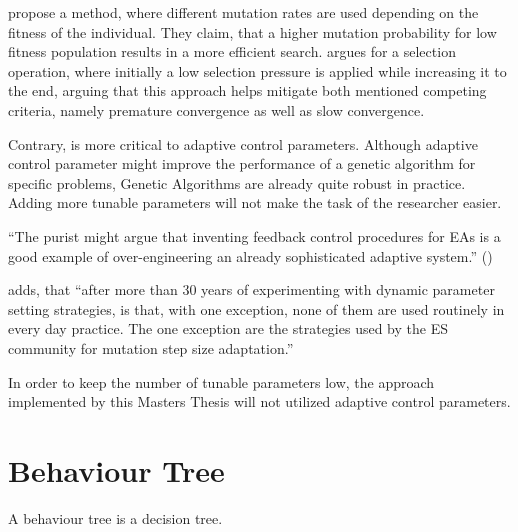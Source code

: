 \cite{marsili_libelli_adaptive_2000} propose a method, where different mutation rates are used depending on the fitness of the individual. They claim, that a higher mutation probability for low fitness population results in a more efficient search. \cite{hussain_trade-off_2020} argues for a selection operation, where initially a low selection pressure is applied while increasing it to the end, arguing that this approach helps mitigate both mentioned competing criteria, namely premature convergence as well as slow convergence.

Contrary, \cite{kacprzyk_parameter_2007} is more critical to adaptive control parameters. Although adaptive control parameter might improve the performance of a genetic algorithm for specific problems, Genetic Algorithms are already quite robust in practice. Adding more tunable parameters will not make the task of the researcher easier.

\enquote{The purist might argue that inventing feedback control procedures for EAs is a good example of over-engineering an already sophisticated adaptive system.} (\cite{kacprzyk_parameter_2007})

\cite{kacprzyk_parameter_2007} adds, that \enquote{after more than 30 years of experimenting with dynamic parameter setting strategies, is that, with one exception, none of them are used routinely in every day practice. The one exception are the strategies used by the ES community for mutation step size adaptation.}

In order to keep the number of tunable parameters low, the approach implemented by this Masters Thesis will not utilized adaptive control parameters.

\section{Behaviour Tree}
A behaviour tree is a decision tree. 